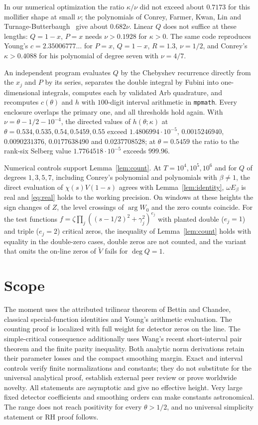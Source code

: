\documentclass[11pt]{article}
\theoremstyle{remark}
\newcommand{\Vt}{\widetilde V}
\begin{document}
In our numerical optimization the ratio $\kappa/\nu$ did not exceed about
$0.7173$ for this mollifier shape at small $\nu$; the polynomials of Conrey,
Farmer, Kwan, Lin and Turnage-Butterbaugh~\cite{CFKL} give about $0.682\nu$.
Linear $Q$ does not suffice at these lengths: $Q=1-x$, $P=x$ needs
$\nu>0.1928$ for $\kappa>0$. The same code reproduces Young's
$c=2.35006777\ldots$ for $P=x$, $Q=1-x$, $R=1.3$, $\nu=1/2$, and Conrey's
$\kappa>0.4088$ for his polynomial of degree seven with $\nu=4/7$.

An independent program evaluates $Q$ by the Chebyshev recurrence directly
from the $x_j$ and $P$ by its series, separates the double integral by
Fubini into one-dimensional integrals, computes each by validated Arb
quadrature, and recomputes $c(\theta)$ and $h$ with $100$-digit interval
arithmetic in \texttt{mpmath}. Every enclosure overlaps the primary one, and
all thresholds hold again. With $\nu=\theta-1/2-10^{-4}$, the directed values
of $h(\theta;\kappa)$ at $\theta=0.534,0.535,0.54,0.5459,0.55$ exceed
$1.4806994\cdot10^{-5}$, $0.0015246940$, $0.0090231376$, $0.0177638490$ and
$0.0237708528$; at $\theta=0.5459$ the ratio to the rank-six Selberg value
$1.7764518\cdot10^{-5}$ exceeds $999.96$.

Numerical controls support Lemma~\ref{lem:count}. At $T=10^4,10^5,10^6$ and
for $Q$ of degrees $1,3,5,7$, including Conrey's polynomial and polynomials
with $\beta\ne1$, the direct evaluation of $\chi(s)V(1-s)$ agrees with
Lemma~\ref{lem:identity}, $\omega E_\beta$ is real and \eqref{eq:real} holds to
the working precision. On windows at these heights the sign changes of $Z$,
the level crossings of $\arg W_0$ and the zero counts coincide. For the test
functions $f=\zeta\prod_j((s-1/2)^2+\gamma_j^2)^{e_j}$ with planted double
($e_j=1$) and triple ($e_j=2$) critical zeros, the inequality of
Lemma~\ref{lem:count} holds with equality in the double-zero cases, double
zeros are not counted, and the variant that omits the on-line zeros of $\Vt$
fails for $\deg Q=1$.

\section{Scope}
The moment uses the attributed trilinear theorem of Bettin and Chandee,
classical special-function identities and Young's arithmetic evaluation.
The counting proof is localized with full weight for detector zeros on
the line. The simple-critical consequence additionally uses Wang's
recent short-interval pair theorem and the finite parity inequality.
Both analytic norm derivations retain their parameter losses and the
compact smoothing margin. Exact and interval controls verify finite
normalizations and constants; they do not substitute for the universal
analytical proof, establish external peer review or prove worldwide novelty.
All statements are asymptotic and give no effective height. Very large
fixed detector coefficients and smoothing orders can make constants
astronomical. The range does not reach positivity for every
$\theta>1/2$, and no universal simplicity statement or RH proof follows.
\end{document}

